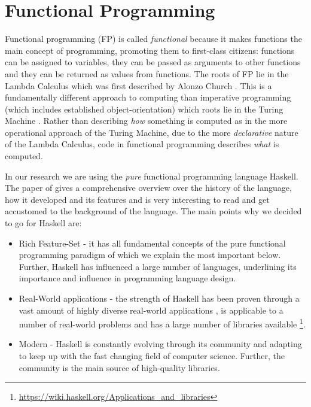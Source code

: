 \section{Functional Programming}
\label{sec:fp}

Functional programming (FP) is called \textit{functional} because it makes functions the main concept of programming, promoting them to first-class citizens: functions can be assigned to variables, they can be passed as arguments to other functions and they can be returned as values from functions. The roots of FP lie in the Lambda Calculus which was first described by Alonzo Church \cite{church_unsolvable_1936}. This is a fundamentally different approach to computing than imperative programming (which includes established object-orientation)  which roots lie in the Turing Machine \cite{turing_computable_1937}. Rather than describing \textit{how} something is computed as in the more operational approach of the Turing Machine, due to the more \textit{declarative} nature of the Lambda Calculus, code in functional programming describes \textit{what} is computed.

In our research we are using the \textit{pure} functional programming language Haskell. The paper of \cite{hudak_history_2007} gives a comprehensive overview over the history of the language, how it developed and its features and is very interesting to read and get accustomed to the background of the language. The main points why we decided to go for Haskell are:

\begin{itemize}
	\item Rich Feature-Set - it has all fundamental concepts of the pure functional programming paradigm of which we explain the most important below. Further, Haskell has influenced a large number of languages, underlining its importance and influence in programming language design.
	\item Real-World applications - the strength of Haskell has been proven through a vast amount of highly diverse real-world applications \cite{hudak_history_2007}, is applicable to a number of real-world problems \cite{osullivan_real_2008} and has a large number of libraries available \footnote{\url{https://wiki.haskell.org/Applications_and_libraries}}.
	\item Modern - Haskell is constantly evolving through its community and adapting to keep up with the fast changing field of computer science. Further, the community is the main source of high-quality libraries.
\end{itemize}

